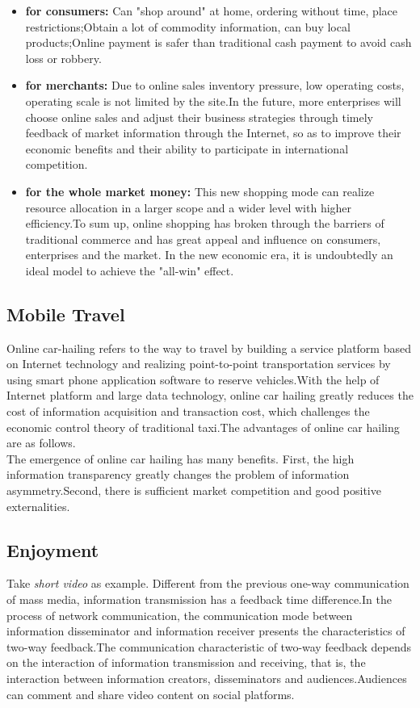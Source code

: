 \documentclass{elsarticle}
\begin{document}
\begin{itemize}
	\item \textbf{for consumers:}
	Can "shop around" at home, ordering without time, place restrictions;Obtain a lot of commodity information, can buy local products;Online payment is safer than traditional cash payment to avoid cash loss or robbery.
	
	\item \textbf{for merchants:} Due to online sales inventory pressure, low operating costs, operating scale is not limited by the site.In the future, more enterprises will choose online sales and adjust their business strategies through timely feedback of market information through the Internet, so as to improve their economic benefits and their ability to participate in international competition.
	
	\item \textbf{for the whole market money:} This new shopping mode can realize resource allocation in a larger scope and a wider level with higher efficiency.To sum up, online shopping has broken through the barriers of traditional commerce and has great appeal and influence on consumers, enterprises and the market. In the new economic era, it is undoubtedly an ideal model to achieve the "all-win" effect.
	
\end{itemize}

\subsection{Mobile Travel}
Online car-hailing refers to the way to travel by building a service platform based on Internet technology and realizing point-to-point transportation services by using smart phone application software to reserve vehicles.With the help of Internet platform and large data technology, online car hailing greatly reduces the cost of information acquisition and transaction cost, which challenges the economic control theory of traditional taxi.The advantages of online car hailing are as follows\cite{che,che3,che4}.\\

The emergence of online car hailing has many benefits. First, the high information transparency greatly changes the problem of information asymmetry.Second, there is sufficient market competition and good positive externalities.


\subsection{Enjoyment}
Take \emph{short video} as example. Different from the previous one-way communication of mass media, information transmission has a feedback time difference.In the process of network communication, the communication mode between information disseminator and information receiver presents the characteristics of two-way feedback.The communication characteristic of two-way feedback depends on the interaction of information transmission and receiving, that is, the interaction between information creators, disseminators and audiences.Audiences can comment and share video content on social platforms.\\
\end{document}
